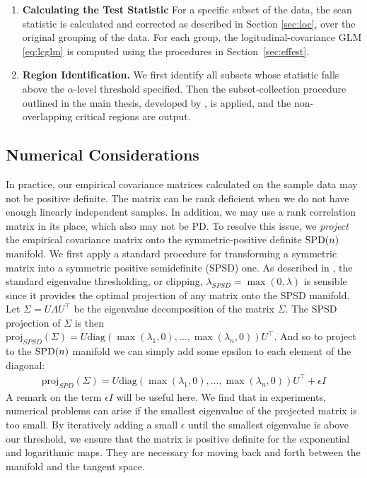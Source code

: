 \begin{enumerate}
\item \textbf{Calculating the Test Statistic} For a specific subset of the data, the scan statistic is calculated and corrected as described in Section \ref{sec:loc}, over the original grouping of the data. For each group, the logitudinal-covariance GLM \eqref{eq:lcglm} is computed using the procedures in Section~\ref{sec:effest}.
%
\item \textbf{Region Identification.} We first identify all subsets whose statistic falls above the $\alpha$-level threshold specified. Then the subset-collection procedure outlined in the main thesis, developed by \cite{jeng2010optimal}, is applied, and the non-overlapping critical regions are output.
\end{enumerate}
%

\subsection*{Numerical Considerations} 
In practice, our empirical covariance matrices calculated on the sample data may not be positive definite. The matrix can be rank deficient when we do not have enough linearly independent samples. 
In addition, we may use a rank correlation matrix in its place, which also may not be PD.
To resolve this issue, we \textit{project} the empirical covariance matrix onto the symmetric-positive definite $\text{SPD}(n)$ manifold. We first apply a standard procedure for transforming a 
symmetric matrix into a symmetric positive semidefinite (SPSD) one. As described in \cite{wu2005analysis}, the standard eigenvalue thresholding, or clipping, $\lambda_{SPSD} = \max(0,\lambda)$ is sensible 
since it provides the optimal projection of any matrix onto the SPSD manifold. 
Let $\Sigma = U\Lambda U^\top$ be the eigenvalue decomposition of the matrix $\Sigma$. The SPSD projection of $\Sigma$ is 
then $\text{proj}_{SPSD}(\Sigma) = U\text{diag}(\max(\lambda_1,0),\ldots,\max(\lambda_n,0))U^\top$. And so to project to the $\text{SPD}(n)$ manifold we can simply add some epsilon to each element of the diagonal: 
\begin{align}
\text{proj}_{SPD}(\Sigma) = U\text{diag}(\max(\lambda_1,0),\ldots,\max(\lambda_n,0))U^\top + \epsilon I
\end{align}
A remark on the term $\epsilon I$ will be useful here. We find that in experiments, numerical problems can arise if the smallest eigenvalue of the projected matrix is too small. 
By iteratively adding a 
small $\epsilon$ until the smallest eigenvalue is above our threshold, we ensure that the matrix is positive definite for the exponential and logarithmic maps. They are necessary for moving back and forth between the manifold and the tangent space.